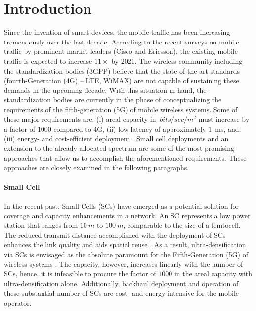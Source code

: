 \chapter{Introduction}

Since the invention of smart devices, the mobile traffic has been increasing tremendously over the last decade. According to the recent surveys on mobile traffic by prominent market leaders (Cisco \cite{CISCO14} and Ericsson\cite{Eric15}), the existing mobile traffic is expected to increase $11 \times$ by 2021. The wireless community including the standardization bodies (3GPP) believe that the state-of-the-art standards (fourth-Generation (4G) -- LTE, WiMAX) are not capable of sustaining these demands in the upcoming decade. With this situation in hand, the standardization bodies are currently in the phase of conceptualizing the requirements of the fifth-generation (5G) of mobile wireless systems.
Some of these major requirements are: (i) areal capacity in $\SI{}{bits/sec/m^2}$ must increase by a factor of $1000$ compared to 4G, (ii) low latency of approximately \SI{1}{ms}, and, (iii) energy- and cost-efficient deployment \cite{Qual13, Andrews14}.
Small cell deployments and an extension to the already allocated spectrum are some of the most promising approaches that allow us to accomplish the aforementioned requirements. These approaches are closely examined in the following paragraphs. 

\subsubsection*{Small Cell}

In the recent past, Small Cells (SCs) have emerged as a potential solution for coverage and capacity enhancements in a network. An SC represents a low power station that ranges from $\SI{10}{m}$ to $\SI{100}{m}$, comparable to the size of a femtocell. The reduced transmit distance accomplished with the deployment of SCs enhances the link quality and aids spatial reuse \cite{Chander08}.
As a result, ultra-densification via SCs is envisaged as the absolute paramount for the Fifth-Generation (5G) of wireless systems \cite{Andrews14}.
The capacity, however, increases linearly with the number of SCs, hence, it is infeasible to procure the factor of $1000$ in the areal capacity with ultra-densification alone.
Additionally, backhaul deployment and operation of these substantial number of SCs are cost- and energy-intensive for the mobile operator.




